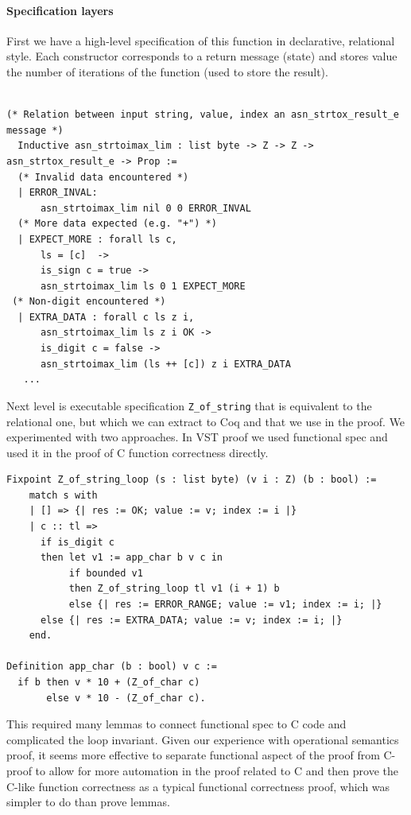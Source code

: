 \documentclass[acmsmall,nonacm]{acmart}
\begin{document}
\paragraph{Specification layers} First we have a high-level specification of this function in declarative, relational style. Each constructor corresponds to a return message (state) and stores value the number of iterations of the function (used to store the result).

 \begin{lstlisting}[language=Coq]

(* Relation between input string, value, index an asn_strtox_result_e message *)
  Inductive asn_strtoimax_lim : list byte -> Z -> Z -> asn_strtox_result_e -> Prop :=
  (* Invalid data encountered *)
  | ERROR_INVAL:
      asn_strtoimax_lim nil 0 0 ERROR_INVAL
  (* More data expected (e.g. "+") *)
  | EXPECT_MORE : forall ls c,
      ls = [c]  ->
      is_sign c = true ->
      asn_strtoimax_lim ls 0 1 EXPECT_MORE
 (* Non-digit encountered *)
  | EXTRA_DATA : forall c ls z i,
      asn_strtoimax_lim ls z i OK ->
      is_digit c = false -> 
      asn_strtoimax_lim (ls ++ [c]) z i EXTRA_DATA
   ...    
  \end{lstlisting}

Next level is executable specification \texttt{Z\_of\_string} that is equivalent to the relational one, but which we can extract to Coq and that we use in the proof. We experimented with two approaches. In VST proof we used functional spec and used it in the proof of C function correctness directly.

 \begin{lstlisting}[language=Coq]
Fixpoint Z_of_string_loop (s : list byte) (v i : Z) (b : bool) := 
    match s with 
    | [] => {| res := OK; value := v; index := i |}
    | c :: tl => 
      if is_digit c
      then let v1 := app_char b v c in 
           if bounded v1
           then Z_of_string_loop tl v1 (i + 1) b
           else {| res := ERROR_RANGE; value := v1; index := i; |}      
      else {| res := EXTRA_DATA; value := v; index := i; |}              
    end.

Definition app_char (b : bool) v c := 
  if b then v * 10 + (Z_of_char c) 
       else v * 10 - (Z_of_char c).
 \end{lstlisting}

This required many lemmas to connect functional spec to C code and complicated the loop invariant. Given our experience with operational semantics proof, it seems more effective to separate functional aspect of the proof from C-proof to allow for more automation in the proof related to C and then prove the C-like function correctness as a typical functional correctness proof, which was simpler to do than prove lemmas.
\end{document}
